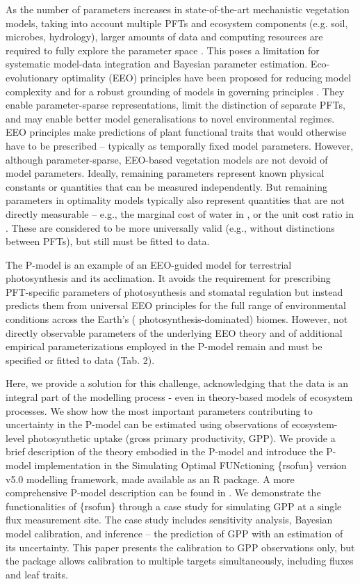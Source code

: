 \documentclass[gmd, manuscript]{copernicus}
\begin{document}
As the number of parameters increases in state-of-the-art mechanistic vegetation models, taking into account multiple PFTs and ecosystem components (e.g. soil, microbes, hydrology), larger amounts of data and computing resources are required to fully explore the parameter space \citep{hartig2012}. This poses a limitation for systematic model-data integration and Bayesian parameter estimation. Eco-evolutionary optimality (EEO) principles have been proposed for reducing model complexity and for a robust grounding of models in governing principles \citep{franklin2020, harrison2021}. They enable parameter-sparse representations, limit the distinction of separate PFTs, and may enable better model generalisations to novel environmental regimes. EEO principles make predictions of plant functional traits that would otherwise have to be prescribed -- typically as temporally fixed model parameters. However, although parameter-sparse, EEO-based vegetation models are not devoid of model parameters. Ideally, remaining parameters represent known physical constants or quantities that can be measured independently. But remaining parameters in optimality models typically also represent quantities that are not directly measurable -- e.g., the marginal cost of water in \citet{cowan1977}, or the unit cost ratio in \citet{prentice2014}. These are considered to be more universally valid (e.g., without distinctions between PFTs), but still must be fitted to data.

The P-model \citep{prentice2014, stocker2020, wang2017} is an example of an EEO-guided model for terrestrial photosynthesis and its acclimation. It avoids the requirement for prescribing PFT-specific parameters of photosynthesis and stomatal regulation but instead predicts them from universal EEO principles for the full range of environmental conditions across the Earth's ( photosynthesis-dominated) biomes. However, not directly observable parameters of the underlying EEO theory and of additional empirical parameterizations employed in the P-model \citep{stocker2020} remain and must be specified or fitted to data (Tab. 2).

Here, we provide a solution for this challenge, acknowledging that the data is an integral part of the modelling process \citep{dietze2013} - even in theory-based models of ecosystem processes. We show how the most important parameters contributing to uncertainty in the P-model can be estimated using observations of ecosystem-level photosynthetic  uptake (gross primary productivity, GPP). We provide a brief description of the theory embodied in the P-model and introduce the P-model implementation in the Simulating Optimal FUNctioning \{rsofun\} version v5.0 modelling framework, made available as an R package. A more comprehensive P-model description can be found in \citet{stocker2020}. We demonstrate the functionalities of \{rsofun\} through a case study for simulating GPP at a single flux measurement site. The case study includes sensitivity analysis, Bayesian model calibration, and inference -- the prediction of GPP with an estimation of its uncertainty. This paper presents the calibration to GPP observations only, but the package allows calibration to multiple targets simultaneously, including fluxes and leaf traits.
\end{document}
